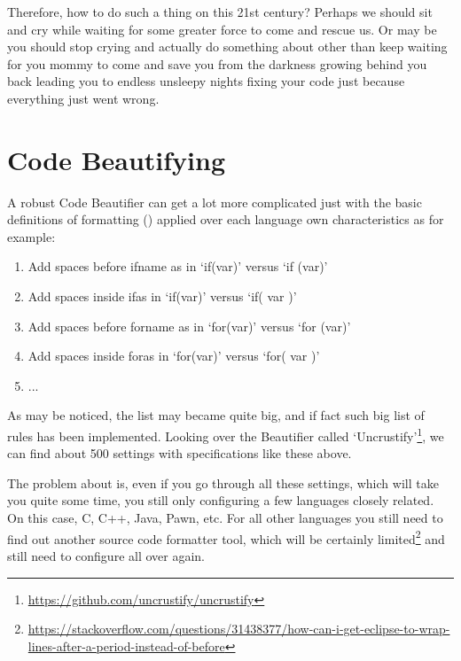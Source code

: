     Therefore, how to do such a thing on this 21\q{}st century?
    Perhaps we should sit and cry while waiting for some greater force to come
    and rescue us. Or may be you should stop crying and actually do something
    about other than keep waiting for you mommy to come and save you from the
    darkness growing behind you back leading you to endless unsleepy nights
    fixing your code just because everything just went wrong.



    \section{Code Beautifying}

    A robust Code Beautifier can get a lot more complicated just with the basic
    definitions of formatting ()
    applied over each language own characteristics
    as for example:

    \begin{enumerate}
        \item Add spaces before if\s name as in `if(var)' versus `if (var)'
        \item Add spaces inside if\s as in `if(var)' versus `if( var )'
        \item Add spaces before for\s name as in `for(var)' versus `for (var)'
        \item Add spaces inside for\s as in `for(var)' versus `for( var )'
        \item ...
    \end{enumerate}

    As may be noticed, the list may became quite big,
    and if fact such big list of rules has been implemented.
    Looking over the Beautifier called
    `Uncrustify'\footnote{\url{https://github.com/uncrustify/uncrustify}},
    we can find about 500 settings with specifications like these above.

    The problem about is, even if you go through all these settings,
    which will take you quite some time,
    you still only configuring a few languages closely related.
    On this case, C, C++, Java, Pawn, etc.
    For all other languages you still need to find out another source code
    formatter tool, which will be certainly
    limited\footnote{\url{https://stackoverflow.com/questions/31438377/how-can-i-get-eclipse-to-wrap-lines-after-a-period-instead-of-before}}
    and still need to configure all over again.


